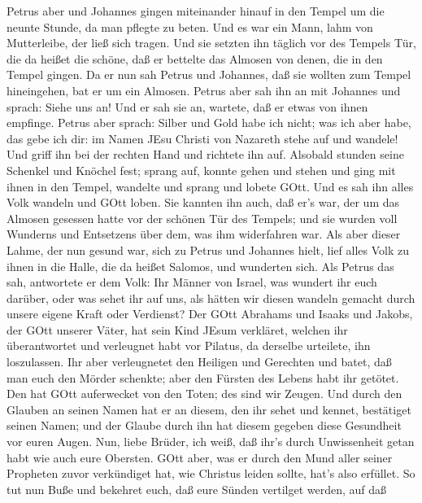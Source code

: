  Petrus aber und Johannes gingen miteinander hinauf in den
Tempel um die neunte Stunde, da man pflegte zu beten.  Und
es war ein Mann, lahm von Mutterleibe, der ließ sich tragen. Und sie
setzten ihn täglich vor des Tempels Tür, die da heißet die schöne, daß
er bettelte das Almosen von denen, die in den Tempel gingen.
 Da er nun sah Petrus und Johannes, daß sie wollten zum
Tempel hineingehen, bat er um ein Almosen.  Petrus aber sah
ihn an mit Johannes und sprach: Siehe uns an!  Und er sah
sie an, wartete, daß er etwas von ihnen empfinge.  Petrus
aber sprach: Silber und Gold habe ich nicht; was ich aber habe, das gebe
ich dir: im Namen JEsu Christi von Nazareth stehe auf und wandele!
 Und griff ihn bei der rechten Hand und richtete ihn auf.
Alsobald stunden seine Schenkel und Knöchel fest;  sprang
auf, konnte gehen und stehen und ging mit ihnen in den Tempel, wandelte
und sprang und lobete GOtt.  Und es sah ihn alles Volk
wandeln und GOtt loben.  Sie kannten ihn auch, daß er's
war, der um das Almosen gesessen hatte vor der schönen Tür des Tempels;
und sie wurden voll Wunderns und Entsetzens über dem, was ihm
widerfahren war.  Als aber dieser Lahme, der nun gesund
war, sich zu Petrus und Johannes hielt, lief alles Volk zu ihnen in die
Halle, die da heißet Salomos, und wunderten sich.  Als
Petrus das sah, antwortete er dem Volk: Ihr Männer von Israel, was
wundert ihr euch darüber, oder was sehet ihr auf uns, als hätten wir
diesen wandeln gemacht durch unsere eigene Kraft oder Verdienst?
 Der GOtt Abrahams und Isaaks und Jakobs, der GOtt unserer
Väter, hat sein Kind JEsum verkläret, welchen ihr überantwortet und
verleugnet habt vor Pilatus, da derselbe urteilete, ihn loszulassen.
 Ihr aber verleugnetet den Heiligen und Gerechten und
batet, daß man euch den Mörder schenkte;  aber den Fürsten
des Lebens habt ihr getötet. Den hat GOtt auferwecket von den Toten; des
sind wir Zeugen.  Und durch den Glauben an seinen Namen hat
er an diesem, den ihr sehet und kennet, bestätiget seinen Namen; und der
Glaube durch ihn hat diesem gegeben diese Gesundheit vor euren Augen.
 Nun, liebe Brüder, ich weiß, daß ihr's durch Unwissenheit
getan habt wie auch eure Obersten.  GOtt aber, was er durch
den Mund aller seiner Propheten zuvor verkündiget hat, wie Christus
leiden sollte, hat's also erfüllet.  So tut nun Buße und
bekehret euch, daß eure Sünden vertilget werden,  auf daß
